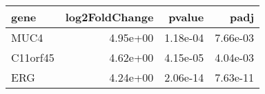 \begin{tabular}{lrrr}
\toprule
    gene &  log2FoldChange &   pvalue &     padj \\
\midrule
    MUC4 &        4.95e+00 & 1.18e-04 & 7.66e-03 \\
C11orf45 &        4.62e+00 & 4.15e-05 & 4.04e-03 \\
     ERG &        4.24e+00 & 2.06e-14 & 7.63e-11 \\
\bottomrule
\end{tabular}
